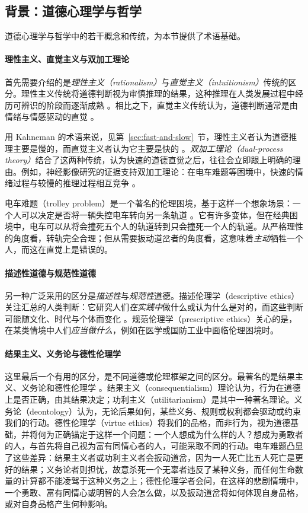 \subsection{背景：道德心理学与哲学}
道德心理学与哲学中的若干概念和传统，为本节提供了术语基础。

\paragraph{理性主义、直觉主义与双加工理论}
首先需要介绍的是\emph{理性主义（rationalism）}与\emph{直觉主义（intuitionism）}传统的区分。理性主义传统将道德判断视为审慎推理的结果，这种推理在人类发展过程中经历可辨识的阶段而逐渐成熟 \citep[例如][]{kohlberg1969stage}。相比之下，直觉主义传统认为，道德判断通常是由情绪与情感驱动的直觉 \citep{haidt2001emotional}。

用 Kahneman 的术语来说，见第~\ref{sec:fast-and-slow}~节，理性主义者认为道德推理主要是慢的，而直觉主义者认为它主要是快的 \citep{kahneman2011thinking}。\emph{双加工理论（dual-process theory）}结合了这两种传统，认为快速的道德直觉之后，往往会立即跟上明确的理由。例如，神经影像研究的证据支持双加工理论：在电车难题等困境中，快速的情绪过程与较慢的推理过程相互竞争 \citep{greene2001fmri}。

电车难题（trolley problem）是一个著名的伦理困境，基于这样一个想象场景：一个人可以决定是否将一辆失控电车转向另一条轨道 \citep{thomson1985trolley}。它有许多变体，但在经典困境中，电车可以从将会撞死五个人的轨道转到只会撞死一个人的轨道。从严格理性的角度看，转轨完全合理；但从需要扳动道岔者的角度看，这意味着\emph{主动}牺牲一个人，而这在直觉上是错误的。

\paragraph{描述性道德与规范性道德}
另一种广泛采用的区分是\emph{描述性}与\emph{规范性}道德。描述伦理学（descriptive ethics）关注汇总的人类判断：它研究人们\emph{在实践中}做什么或认为什么是对的，而这些判断可能随文化、时代与个体而变化 \citep{hamalainen2016descriptive}。规范伦理学（prescriptive ethics）关心的是，在某类情境中人们\emph{应当做什么}，例如在医学或国防工业中面临伦理困境时。

\paragraph{结果主义、义务论与德性伦理学}
这里最后一个有用的区分，是不同道德或伦理框架之间的区分。最著名的是结果主义、义务论和德性伦理学 \citep{shaferlandau2024fundamentals}。结果主义（consequentialism）理论认为，行为在道德上是否正确，由其结果决定；功利主义（utilitarianism）是其中一种著名理论。义务论（deontology）认为，无论后果如何，某些义务、规则或权利都会驱动或约束我们的行动。德性伦理学（virtue ethics）将我们的品格，而非行为，视为道德基础，并将何为正确锚定于这样一个问题：一个人想成为什么样的人？想成为勇敢者的人，与首先将自己视为富有同情心者的人，可能采取不同的行动。电车难题凸显了这些差异：结果主义者或功利主义者会扳动道岔，因为一人死亡比五人死亡是更好的结果；义务论者则担忧，故意杀死一个无辜者违反了某种义务，而任何生命数量的计算都不能凌驾于这种义务之上；德性伦理学者会问，在这样的悲剧情境中，一个勇敢、富有同情心或明智的人会怎么做，以及扳动道岔将如何体现自身品格，或对自身品格产生何种影响。

